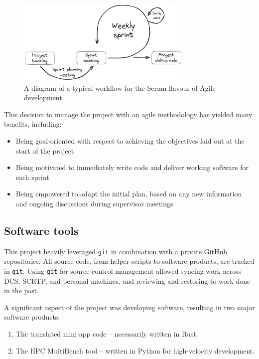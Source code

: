 \begin{figure}[h]
    \centering
    \includegraphics[width=0.75\textwidth]{images/6_project_management/excalidraw_agile.png}
    \caption{A diagram of a typical workflow for the Scrum flavour of Agile development.}
    \label{fig:excalidraw_agile}
\end{figure}

This decision to manage the project with an agile methodology has yielded many benefits, including:

\begin{itemize}
    \item Being goal-oriented with respect to achieving the objectives laid out at the start of the project
    \item Being motivated to immediately write code and deliver working software for each sprint
    \item Being empowered to adapt the initial plan, based on any new information and ongoing discussions during supervisor meetings
\end{itemize}

\subsection{Software tools}
\label{ssec:software-tools}

This project heavily leveraged \texttt{git} in combination with a private GitHub repositories. All source code, from helper scripts to software products, are tracked in \texttt{git}. Using \texttt{git} for source control management allowed syncing work across DCS, SCRTP, and personal machines, and reviewing and restoring to work done in the past.

A significant aspect of the project was developing software, resulting in two major software products:

\begin{enumerate}
    \item The translated mini-app code -- necessarily written in Rust.
    \item The HPC MultiBench tool -- written in Python for high-velocity development.
\end{enumerate}

